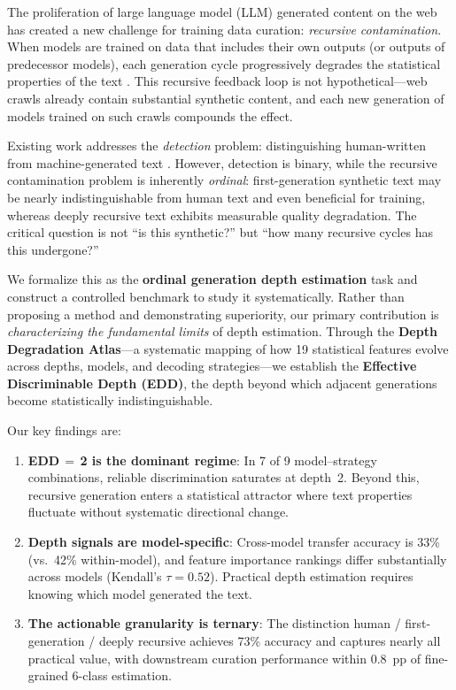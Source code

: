 \documentclass[11pt,a4paper]{article}
\begin{document}
The proliferation of large language model (LLM) generated content on the web has created a new challenge for training data curation: \emph{recursive contamination}.
When models are trained on data that includes their own outputs (or outputs of predecessor models), each generation cycle progressively degrades the statistical properties of the text \citep{shumailov2024ai,drayson2025model}.
This recursive feedback loop is not hypothetical---web crawls already contain substantial synthetic content, and each new generation of models trained on such crawls compounds the effect.

Existing work addresses the \emph{detection} problem: distinguishing human-written from machine-generated text \citep{mitchell2023detectgpt,bao2024fastdetectgpt,tulchinskii2024diveye,deng2024editlens}.
However, detection is binary, while the recursive contamination problem is inherently \emph{ordinal}: first-generation synthetic text may be nearly indistinguishable from human text and even beneficial for training, whereas deeply recursive text exhibits measurable quality degradation.
The critical question is not ``is this synthetic?'' but ``how many recursive cycles has this undergone?''

We formalize this as the \textbf{ordinal generation depth estimation} task and construct a controlled benchmark to study it systematically.
Rather than proposing a method and demonstrating superiority, our primary contribution is \emph{characterizing the fundamental limits} of depth estimation.
Through the \textbf{Depth Degradation Atlas}---a systematic mapping of how 19 statistical features evolve across depths, models, and decoding strategies---we establish the \textbf{Effective Discriminable Depth (EDD)}, the depth beyond which adjacent generations become statistically indistinguishable.

Our key findings are:
\begin{enumerate}
    \item \textbf{EDD\,$=$\,2 is the dominant regime}: In 7 of 9 model--strategy combinations, reliable discrimination saturates at depth~2. Beyond this, recursive generation enters a statistical attractor where text properties fluctuate without systematic directional change.
    \item \textbf{Depth signals are model-specific}: Cross-model transfer accuracy is 33\% (vs.\ 42\% within-model), and feature importance rankings differ substantially across models (Kendall's $\tau = 0.52$). Practical depth estimation requires knowing which model generated the text.
    \item \textbf{The actionable granularity is ternary}: The distinction human / first-generation / deeply recursive achieves 73\% accuracy and captures nearly all practical value, with downstream curation performance within 0.8~pp of fine-grained 6-class estimation.
\end{enumerate}
\end{document}
